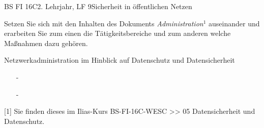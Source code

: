 \documentclass[oneside,openany,headings=optiontotoc,11pt,numbers=noenddot]{scrreprt}
\begin{document}
	\begin{worksheet}{BS FI 16C}{2. Lehrjahr, LF 9}{Sicherheit in öffentlichen Netzen}
		\begin{framed}
			\noindent
			Setzen Sie sich mit den Inhalten des Dokuments \textit{Administration}\(^{1}\) auseinander und erarbeiten Sie zum einen die Tätigkeitsbereiche und zum anderen welche Maßnahmen dazu gehören.\\
			\par \bigskip \noindent			
			\small Netzwerkadministration im Hinblick auf Datenschutz und Datensicherheit
			\begin{itemize}
				\item[-]
				\item[-]
			\end{itemize}
			\tiny{\color{codegray}[1] Sie finden dieses im Ilias-Kurs BS-FI-16C-WESC >> 05 Datensicherheit und Datenschutz.}
		\end{framed}
		\begin{framed}
			\noindent
			\begin{tabularx}{\textwidth}{|X|X|}
				\hline

\end{tabularx}
\end{framed}
\end{worksheet}
\end{document}
